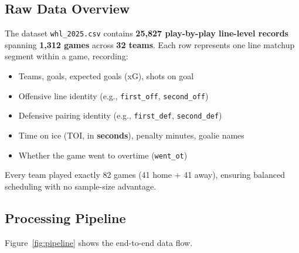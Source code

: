 \documentclass[11pt, a4paper]{article}
\begin{document}
\subsection{Raw Data Overview}
The dataset \texttt{whl\_2025.csv} contains \textbf{25,827 play-by-play line-level records} spanning \textbf{1,312 games} across \textbf{32 teams}. Each row represents one line matchup segment within a game, recording:

\begin{itemize}[nosep]
    \item Teams, goals, expected goals (xG), shots on goal
    \item Offensive line identity (e.g., \texttt{first\_off}, \texttt{second\_off})
    \item Defensive pairing identity (e.g., \texttt{first\_def}, \texttt{second\_def})
    \item Time on ice (TOI, in \textbf{seconds}), penalty minutes, goalie names
    \item Whether the game went to overtime (\texttt{went\_ot})
\end{itemize}

Every team played exactly 82 games (41 home + 41 away), ensuring balanced scheduling with no sample-size advantage.

\subsection{Processing Pipeline}

Figure~\ref{fig:pipeline} shows the end-to-end data flow.
\end{document}
